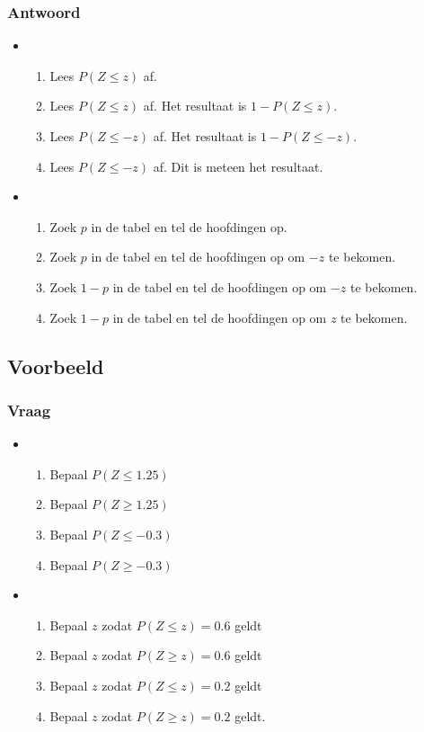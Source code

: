 \documentclass[main.tex]{subfiles}
\begin{document}
\subsubsection*{Antwoord}
\begin{itemize}
\item 
  \begin{enumerate}
  \item Lees $P(Z \le z)$ af.
  \item Lees $P(Z \le z)$ af. Het resultaat is $1-P(Z \le z)$.
  \item Lees $P(Z \le -z)$ af. Het resultaat is $1-P(Z \le -z)$.
  \item Lees $P(Z \le -z)$ af. Dit is meteen het resultaat.
  \end{enumerate}
\item
  \begin{enumerate}
  \item Zoek $p$ in de tabel en tel de hoofdingen op.
  \item Zoek $p$ in de tabel en tel de hoofdingen op om $-z$ te bekomen.
  \item Zoek $1-p$ in de tabel en tel de hoofdingen op om $-z$ te bekomen.
  \item Zoek $1-p$ in de tabel en tel de hoofdingen op om $z$ te bekomen.
  \end{enumerate}
\end{itemize}


\subsection*{Voorbeeld}
\subsubsection*{Vraag}
\begin{itemize}
\item
  \begin{enumerate}
  \item Bepaal $P(Z \le 1.25)$
  \item Bepaal $P(Z \ge 1.25)$
  \item Bepaal $P(Z \le -0.3)$
  \item Bepaal $P(Z \ge -0.3)$
  \end{enumerate}
\item
  \begin{enumerate}
  \item Bepaal $z$ zodat $P(Z \le z) = 0.6$ geldt
  \item Bepaal $z$ zodat $P(Z \ge z) = 0.6$ geldt
  \item Bepaal $z$ zodat $P(Z \le z) = 0.2$ geldt
  \item Bepaal $z$ zodat $P(Z \ge z) = 0.2$ geldt.
  \end{enumerate}
\end{itemize}
\end{document}
